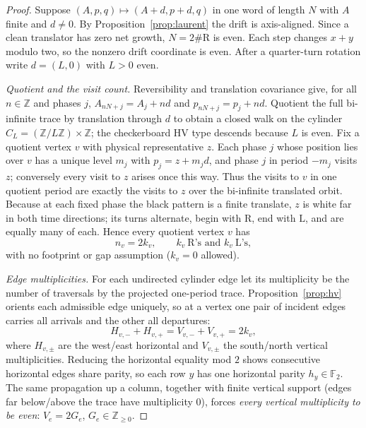\documentclass[11pt,reqno]{amsart}
\theoremstyle{plain}
\theoremstyle{definition}
\newcommand{\Z}{\mathbb{Z}}
\newcommand{\F}{\mathbb{F}}
\newcommand{\drift}{d}
\newcommand{\turnR}{\mathrm{R}}
\newcommand{\turnL}{\mathrm{L}}
\begin{document}
\begin{proof}
Suppose $(A,p,q)\mapsto(A+\drift,p+\drift,q)$ in one word of length $N$ with $A$
finite and $\drift\neq0$. By Proposition~\ref{prop:laurent} the drift is
axis-aligned. Since a clean translator has zero net growth,
$N=2\#\turnR$ is even. Each step changes $x+y$ modulo two, so the nonzero drift
coordinate is even. After a quarter-turn rotation write $\drift=(L,0)$ with
$L>0$ even.

\emph{Quotient and the visit count.} Reversibility and translation covariance
give, for all $n\in\Z$ and phases $j$, $A_{nN+j}=A_j+n\drift$ and
$p_{nN+j}=p_j+n\drift$. Quotient the full bi-infinite trace by translation
through $\drift$ to obtain a closed walk on the cylinder
$C_L=(\Z/L\Z)\times\Z$; the checkerboard HV type descends because $L$ is even.
Fix a quotient vertex $v$ with physical representative $z$. Each phase $j$ whose
position lies over $v$ has a unique level $m_j$ with $p_j=z+m_j\drift$, and phase
$j$ in period $-m_j$ visits $z$; conversely every visit to $z$ arises once this
way. Thus the visits to $v$ in one quotient period are exactly the visits to $z$
over the bi-infinite translated orbit. Because at each fixed phase the black
pattern is a finite translate, $z$ is white far in both time directions; its
turns alternate, begin with $\turnR$, end with $\turnL$, and are equally many of
each. Hence every quotient vertex $v$ has
\begin{equation}\label{eq:visitcount}
n_v=2k_v,\qquad k_v\ \turnR\text{'s and }k_v\ \turnL\text{'s},
\end{equation}
with no footprint or gap assumption ($k_v=0$ allowed).

\emph{Edge multiplicities.} For each undirected cylinder edge let its
multiplicity be the number of traversals by the projected one-period trace.
Proposition~\ref{prop:hv} orients each admissible edge uniquely, so at a vertex
one pair of incident edges carries all arrivals and the other all departures:
\begin{equation}\label{eq:balance}
H_{v,-}+H_{v,+}=V_{v,-}+V_{v,+}=2k_v,
\end{equation}
where $H_{v,\pm}$ are the west/east horizontal and $V_{v,\pm}$ the south/north
vertical multiplicities. Reducing the horizontal equality mod $2$ shows
consecutive horizontal edges share parity, so each row $y$ has one horizontal
parity $h_y\in\F_2$. The same propagation up a column, together with finite
vertical support (edges far below/above the trace have multiplicity $0$), forces
\emph{every vertical multiplicity to be even}: $V_e=2G_e$, $G_e\in\Z_{\ge0}$.


\end{proof}
\end{document}
